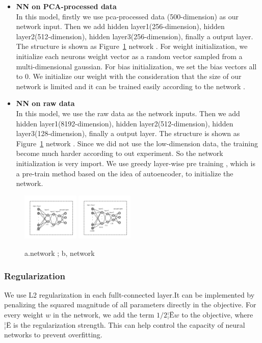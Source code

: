\documentclass[sigconf]{acmart}
\begin{document}
\begin{itemize}
	\item \textbf{NN on PCA-processed data}\\
	In this model, firstly we use pca-processed data (500-dimension) as our network input. Then we add hidden layer1(256-dimension), hidden layer2(512-dimension), hidden layer3(256-dimension), finally a output layer.  The structure is shown as Figure~\ref{nn_1} network . 
	For weight initialization, we initialize each neurons weight vector as a random vector sampled from a multi-dimensional gaussian. For bias initialization, we set the bias vectors all to $0$. We initialize our weight with the consideration that the size of our network is limited and it can be trained easily according to the network .
	
	\item \textbf{NN on raw data}\\
	In this model, we use the raw data as the network inputs. Then we add hidden layer1(8192-dimension), hidden layer2(512-dimension), hidden layer3(128-dimension), finally a output layer.  The structure is shown as Figure~\ref{nn_1} network . Since we did not use the low-dimension data, the training become much harder according to out experiment. So the network initialization is very import. We use greedy layer-wise pre training , which is a pre-train method based on the idea of autoencoder, to initialize the network. 
\end{itemize}

\begin{figure}[!ht]
	\centering
	\includegraphics[width=0.24\textwidth]{../figs/nn_pca.pdf}
	\includegraphics[width=0.24\textwidth]{../figs/nn_raw.pdf}
	\caption{a.network ;  b, network }
	\label{nn_1}
	\centering
\end{figure}

\subsubsection{Regularization}
We use L2 regularization in each fullt-connected layer.It can be implemented by penalizing the squared magnitude of all parameters directly in the objective. For every weight $w$ in the network, we add the term $1/2¦Ëw$ to the objective, where ¦Ë is the regularization strength. This can help control the capacity of neural networks to prevent overfitting.
\end{document}
